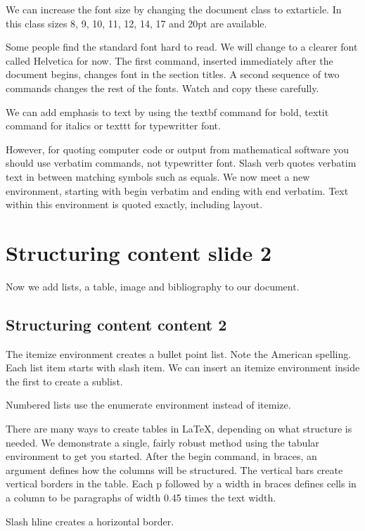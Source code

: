 \documentclass[a4paper,14pt]{extarticle}
\begin{document}
We can increase the font size by changing the document class to extarticle. In this class sizes 8, 9, 10, 11, 12, 14, 17 and 20pt are available. 

Some people find the standard font hard to read. We will change to a clearer font called Helvetica for now. The first command, inserted immediately after the document begins, changes font in the section titles. A second sequence of two commands changes the rest of the fonts. Watch and copy these carefully. 

We can add emphasis to text by using the textbf command for bold, textit command for italics or texttt for typewritter font.

However, for quoting computer code or output from mathematical software you should use verbatim commands, not typewritter font. Slash verb quotes verbatim text in between matching symbols such as equals. We now meet a new environment, starting with begin verbatim and ending with end verbatim. Text within this environment is quoted exactly, including layout. 

\section{Structuring content slide 2}

Now we add lists, a table, image and bibliography to our document. 

\subsection{Structuring content content 2}

The itemize environment creates a bullet point list. Note the American spelling. Each list item starts with slash item. We can insert an itemize environment inside the first to create a sublist. 

Numbered lists use the enumerate environment instead of itemize. 

There are many ways to create tables in LaTeX, depending on what structure is needed. We demonstrate a single, fairly robust method using the tabular environment to get you started. After the begin command, in braces, an argument defines how the columns will be structured. The vertical bars create vertical borders in the table. Each p followed by a width in braces defines cells in a column to be paragraphs of width 0.45 times the text width.

Slash hline creates a horizontal border. 
\end{document}
